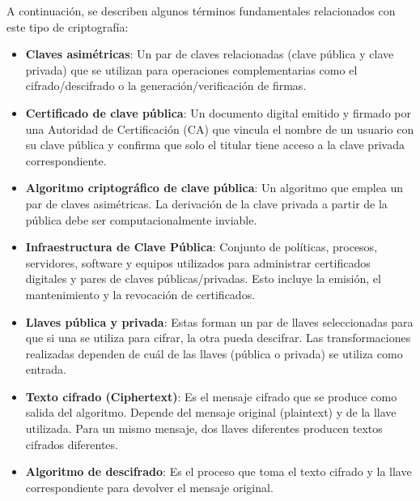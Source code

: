 A continuación, se describen algunos términos fundamentales relacionados con este tipo de criptografía:

\begin{itemize}
  \item \textbf{Claves asimétricas}: Un par de claves relacionadas (clave pública y clave privada) que se utilizan para operaciones complementarias como el cifrado/descifrado o la generación/verificación de firmas.
  \item \textbf{Certificado de clave pública}: Un documento digital emitido y firmado por una Autoridad de Certificación (CA) que vincula el nombre de un usuario con su clave pública y confirma que solo el titular tiene acceso a la clave privada correspondiente.
  \item \textbf{Algoritmo criptográfico de clave pública}: Un algoritmo que emplea un par de claves asimétricas. La derivación de la clave privada a partir de la pública debe ser computacionalmente inviable.
  \item \textbf{Infraestructura de Clave Pública}: Conjunto de políticas, procesos, servidores, software y equipos utilizados para administrar certificados digitales y pares de claves públicas/privadas. Esto incluye la emisión, el mantenimiento y la revocación de certificados.
  \item \textbf{Llaves pública y privada}: Estas forman un par de llaves seleccionadas para que si una se utiliza para cifrar, la otra pueda descifrar. Las transformaciones realizadas dependen de cuál de las llaves (pública o privada) se utiliza como entrada.
  \item \textbf{Texto cifrado (Ciphertext)}: Es el mensaje cifrado que se produce como salida del algoritmo. Depende del mensaje original (plaintext) y de la llave utilizada. Para un mismo mensaje, dos llaves diferentes producen textos cifrados diferentes.
  \item \textbf{Algoritmo de descifrado}: Es el proceso que toma el texto cifrado y la llave correspondiente para devolver el mensaje original.
\end{itemize}

